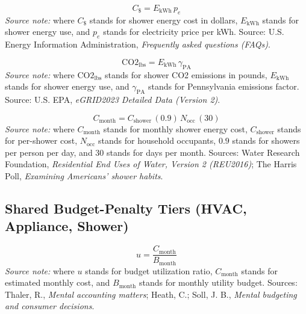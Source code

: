 \documentclass[12pt]{article}
\begin{document}
\begin{equation}
\label{eq:shower_cost}
C_{\$} = E_{\mathrm{kWh}}\,p_e
\end{equation}
\noindent\textit{Source note:} where $C_{\$}$ stands for shower energy cost in dollars, $E_{\mathrm{kWh}}$ stands for shower energy use, and $p_e$ stands for electricity price per kWh. Source: U.S. Energy Information Administration, \emph{Frequently asked questions (FAQs)}.

\begin{equation}
\label{eq:shower_emissions}
\mathrm{CO2}_{\mathrm{lbs}} = E_{\mathrm{kWh}}\,\gamma_{\mathrm{PA}}
\end{equation}
\noindent\textit{Source note:} where $\mathrm{CO2}_{\mathrm{lbs}}$ stands for shower CO2 emissions in pounds, $E_{\mathrm{kWh}}$ stands for shower energy use, and $\gamma_{\mathrm{PA}}$ stands for Pennsylvania emissions factor. Source: U.S. EPA, \emph{eGRID2023 Detailed Data (Version 2)}.

\begin{equation}
\label{eq:shower_monthly_cost}
C_{\mathrm{month}} = C_{\mathrm{shower}}\,(0.9)\,N_{\mathrm{occ}}\,(30)
\end{equation}
\noindent\textit{Source note:} where $C_{\mathrm{month}}$ stands for monthly shower energy cost, $C_{\mathrm{shower}}$ stands for per-shower cost, $N_{\mathrm{occ}}$ stands for household occupants, $0.9$ stands for showers per person per day, and $30$ stands for days per month. Sources: Water Research Foundation, \emph{Residential End Uses of Water, Version 2 (REU2016)}; The Harris Poll, \emph{Examining Americans' shower habits}.

\subsection{Shared Budget-Penalty Tiers (HVAC, Appliance, Shower)}

\begin{equation}
\label{eq:budget_utilization}
u = \frac{C_{\mathrm{month}}}{B_{\mathrm{month}}}
\end{equation}
\noindent\textit{Source note:} where $u$ stands for budget utilization ratio, $C_{\mathrm{month}}$ stands for estimated monthly cost, and $B_{\mathrm{month}}$ stands for monthly utility budget. Sources: Thaler, R., \emph{Mental accounting matters}; Heath, C.; Soll, J. B., \emph{Mental budgeting and consumer decisions}.
\end{document}

